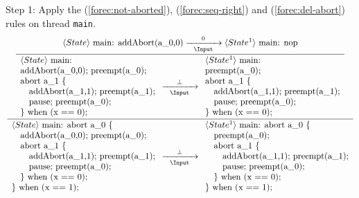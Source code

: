 \noindent
Step 1: Apply the (\ref{forec:not-aborted}), (\ref{forec:seq-right}) and 
(\ref{forec:del-abort}) rules on thread \verb$main$.
\begin{equation*}
	\frac{
		\dfrac{
				\langle State \rangle ~ \text{main: addAbort(a\_0,0)}
					\xrightarrow[~~\Input~~]{0}
				\langle State^1 \rangle ~ \text{main: nop}
			}{
				\begin{array}{l}
					\langle State \rangle ~ \text{main:}		\\
					\text{addAbort(a\_0,0); preempt(a\_0);}		\\
					\text{abort a\_1 \{}						\\
					\text{~~~addAbort(a\_1,1); preempt(a\_1);}	\\
					\text{~~~pause; preempt(a\_0);}				\\
					\text{\} when (x == 0);}					
				\end{array}
					\xrightarrow[~~\Input~~]{\bot} 
				\begin{array}{l}
					\langle State^1 \rangle ~ \text{main:}		\\
					\text{preempt(a\_0);}						\\
					\text{abort a\_1 \{}						\\
					\text{~~~addAbort(a\_1,1); preempt(a\_1);}	\\
					\text{~~~pause; preempt(a\_0);}				\\
					\text{\} when (x == 0);}					
				\end{array}
			}
		}{
			\begin{array}{l}
				\langle State \rangle ~ \text{main: abort a\_0 \{}	\\
				\text{~~~addAbort(a\_0,0); preempt(a\_0);}			\\
				\text{~~~abort a\_1 \{}								\\
				\text{~~~~~~addAbort(a\_1,1); preempt(a\_1);}		\\
				\text{~~~~~~pause; preempt(a\_0);}					\\
				\text{~~~\} when (x == 0);}							\\
				\text{\} when (x == 1);}
			\end{array}
				\xrightarrow[~~\Input~~]{\bot} 
			\begin{array}{l}
				\langle State^1 \rangle ~ \text{main: abort a\_0 \{}\\
				\text{~~~preempt(a\_0);}							\\
				\text{~~~abort a\_1 \{}								\\
				\text{~~~~~~addAbort(a\_1,1); preempt(a\_1);}		\\
				\text{~~~~~~pause; preempt(a\_0);}					\\
				\text{~~~\} when (x == 0);}							\\
				\text{\} when (x == 1);}
			\end{array}
		}
\end{equation*}

